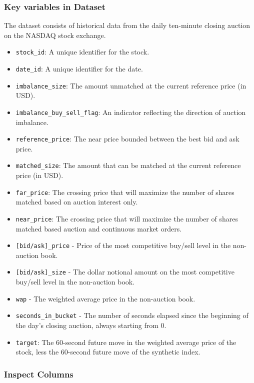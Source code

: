 \documentclass[12pt]{article}
\newtheorem{Proof of Lemma}{Proof of Lemma}
\begin{document}
\subsubsection*{Key variables in Dataset}
The dataset consists of historical data from the daily ten-minute closing auction on the NASDAQ stock exchange.
\begin{itemize}
  \item \texttt{stock\_id}: A unique identifier for the stock.
  \item \texttt{date\_id}: A unique identifier for the date.
  \item \texttt{imbalance\_size}: The amount unmatched at the current reference price (in USD).
  \item \texttt{imbalance\_buy\_sell\_flag}: An indicator reflecting the direction of auction imbalance.
  \item \texttt{reference\_price}: The near price bounded between the best bid and ask price.
  \item \texttt{matched\_size}: The amount that can be matched at the current reference price (in USD).
  \item \texttt{far\_price}: The crossing price that will maximize the number of shares matched based on auction interest only.
  \item \texttt{near\_price}: The crossing price that will maximize the number of shares matched based auction and continuous market orders.
  \item \texttt{[bid/ask]\_price} - Price of the most competitive buy/sell level in the non-auction book.
  \item \texttt{[bid/ask]\_size} - The dollar notional amount on the most competitive buy/sell level in the non-auction book.
  \item \texttt{wap} - The weighted average price in the non-auction book.
  \item \texttt{seconds\_in\_bucket} - The number of seconds elapsed since the beginning of the day's closing auction, always starting from 0.
  \item \texttt{target}: The 60-second future move in the weighted average price of the stock, less the 60-second future move of the synthetic index.
\end{itemize}


\subsubsection*{Inspect Columns}
\end{document}
